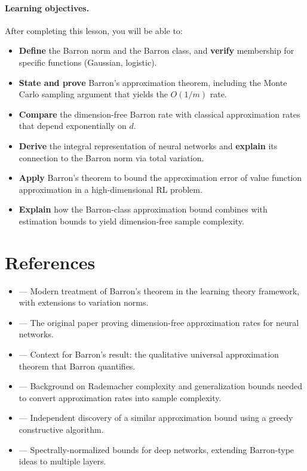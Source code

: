 \documentclass[11pt,a4paper]{article}
\begin{document}
\paragraph{Learning objectives.}
After completing this lesson, you will be able to:
\begin{itemize}[nosep]
  \item \textbf{Define} the Barron norm and the Barron class, and
    \textbf{verify} membership for specific functions (Gaussian, logistic).
  \item \textbf{State and prove} Barron's approximation theorem, including
    the Monte Carlo sampling argument that yields the $O(1/m)$ rate.
  \item \textbf{Compare} the dimension-free Barron rate with classical
    approximation rates that depend exponentially on $d$.
  \item \textbf{Derive} the integral representation of neural networks and
    \textbf{explain} its connection to the Barron norm via total variation.
  \item \textbf{Apply} Barron's theorem to bound the approximation error of
    value function approximation in a high-dimensional RL problem.
  \item \textbf{Explain} how the Barron-class approximation bound combines
    with estimation bounds to yield dimension-free sample complexity.
\end{itemize}

\section{References}
\label{sec:references}

\begin{itemize}
  \item \citet[Chapter 7]{bach2024} --- Modern treatment of Barron's
    theorem in the learning theory framework, with extensions to variation
    norms.
  \item \citet{barron1993} --- The original paper proving dimension-free
    approximation rates for neural networks.
  \item \citet{cybenko1989} --- Context for Barron's result: the
    qualitative universal approximation theorem that Barron quantifies.
  \item \citet[Chapters 4--5]{bach2024} --- Background on Rademacher
    complexity and generalization bounds needed to convert approximation
    rates into sample complexity.
  \item \citet{jones1992} --- Independent discovery of a similar
    approximation bound using a greedy constructive algorithm.
  \item \citet{bartlett2017} --- Spectrally-normalized bounds for deep
    networks, extending Barron-type ideas to multiple layers.
\end{itemize}
\end{document}
